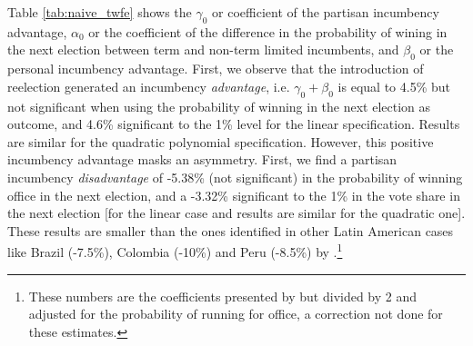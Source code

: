 \documentclass[12pt]{amsart}
\makeatletter
\def\section{\@startsection{section}{1}
	\z@{1.0\linespacing\@plus\linespacing}{.5\linespacing}{\Large}}
\numberwithin{equation}{section}
\theoremstyle{definition}
\theoremstyle{definition}
\theoremstyle{definition}
\makeatother
\begin{document}
\section{Main Results \label{sec:results}}

Table \ref{tab:naive_twfe} shows the $\gamma_0$ or coefficient of the partisan incumbency advantage, $\alpha_0$ or the coefficient of the difference in the probability of wining in the next election between term and non-term limited incumbents, and $\beta_0$ or the personal incumbency advantage. First, we observe that the introduction of reelection generated an incumbency \emph{advantage}, i.e. $\gamma_0 + \beta_0$ is equal to 4.5\% but not significant when using the probability of winning in the next election as outcome, and 4.6\% significant to the 1\% level for the linear specification. Results are similar for the quadratic polynomial specification. However, this positive incumbency advantage masks an asymmetry. First, we find a partisan incumbency \emph{disadvantage} of -5.38\% (not significant) in the probability of winning office in the next election, and a -3.32\% significant to the 1\% in the vote share in the next election [for the linear case and results are similar for the quadratic one]. These results are smaller than the ones identified in other Latin American cases like Brazil (-7.5\%), Colombia (-10\%) and Peru (-8.5\%) by \citet{klasnja_titiunik_2017}.\footnote{These numbers are the coefficients presented by \citet{klasnja_titiunik_2017} but divided by 2 and adjusted for the probability of running for office, a correction not done for these estimates.} 
 
\begin{table}[h]\def\sym#1{\ifmmode^{#1}\else\(^{#1}\)\fi}
\centering
\caption{Partisan and Personal Incumbency Advantage, Difference-in-Discontinuity of Close Elections Model}
\label{tab:naive_twfe}
\end{table}    
\end{document}
